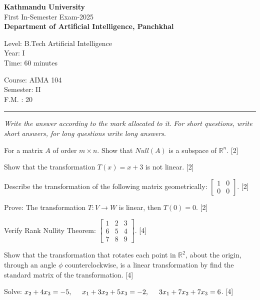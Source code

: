 \documentclass[12pt]{exam}
\begin{document}
\begin{center}
 {\bfseries  {\Large Kathmandu University}} \\[1mm]
 First In-Semester Exam-2025\\[-1mm]
 {\small \textbf{Department of Artificial Intelligence, Panchkhal}}
\end{center}
\vskip 5mm

\begin{minipage}{0.70\linewidth}
  \begin{flushleft}
    Level: B.Tech Artificial Intelligence \\
    Year: I \\
    Time: 60 minutes
  \end{flushleft}
\end{minipage} \hfill
\begin{minipage}{0.25\linewidth}
  \begin{flushleft}
    Course: AIMA 104 \\
    Semester: II \\
    F.M. : 20
  \end{flushleft}
\end{minipage}
\vskip 2mm
\rule{\textwidth}{1pt}
\hskip 15mm \textit{Write the answer according to the mark allocated to it}. \textit{For short questions, write short answers, for long questions write long answers}.

\vskip 10mm

\begin{questions}
\question For a matrix $A$ of order $m \times n$. Show that $Null(A)$ is a subspace of $\mathbb{R}^n$. [2]

  \question Show that the transformation $T(x)=x+3$ is not linear. [2]

  \question Describe the transformation of the following matrix geometrically:
  $\begin{bmatrix}
    1 & 0\\
    0 & 0
  \end{bmatrix}$. [2]

\question Prove: The transformation $T: V \to W$ is linear, then $T(0)=0$. [2]

  \question Verify Rank Nullity Theorem: $\displaystyle \begin{bmatrix}
    1 & 2 & 3 \\
    6 & 5 &4 \\
    7 & 8 & 9
\end{bmatrix}.$ [4]

\question Show that the transformation that rotates each point in $\mathbb{R}^2$, about the origin, through an angle $\phi$ counterclockwise, is a linear transformation by find the standard matrix of the transformation. [4]

\question Solve: \hspace{2mm} $x_2+4x_3 = -5, \hspace{5mm} x_1+3x_2+5x_3 = -2, \hspace{5mm} 3x_1 + 7x_2 + 7x_3 = 6$. [4]


\end{questions}
\end{document}
